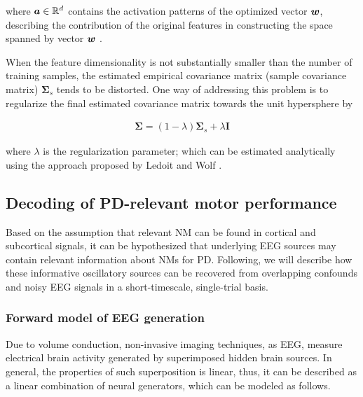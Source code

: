 \documentclass[10pt,a4paper, twocolumn]{article}
\providecommand{\mat}[1]{{\bm {#1}}}
\begin{document}
where ${\bm {a}} \in \mathbb{R} ^ {d}$ contains the activation patterns of the optimized vector ${\bm {w}}$, describing the contribution of the original features in constructing the space spanned by vector ${\bm {w}}$ \cite{haufe2014interpretation}.

When the feature dimensionality is not substantially smaller than the number of training samples, the estimated empirical covariance matrix (sample covariance matrix) $\mat{\Sigma}_s$ tends to be distorted. One way of addressing this problem is to regularize the final estimated covariance matrix towards the unit hypersphere by

\begin{align*}
\mat{\Sigma} = (1-\lambda)\mat{\Sigma}_s + \lambda\mat{I}
\end{align*}

where $\lambda$ is the regularization parameter; which can be estimated analytically using the approach proposed by Ledoit and Wolf \cite{ledoit2004well}.
\subsection{Decoding of PD-relevant motor performance}

Based on the assumption that relevant NM can be found in cortical and subcortical signals, it can be hypothesized that underlying EEG sources may contain relevant information about NMs for PD.  Following, we will describe how these informative oscillatory sources can be recovered from overlapping confounds and noisy EEG signals in a short-timescale, single-trial basis. 

\subsubsection{Forward model of EEG generation}
\label{par:modeling}
Due to volume conduction, non-invasive imaging techniques, as EEG, measure electrical brain activity generated by superimposed hidden brain sources. In general, the properties of such superposition is linear, thus, it can be described as a linear combination of neural generators, which can be modeled as follows.
\end{document}
